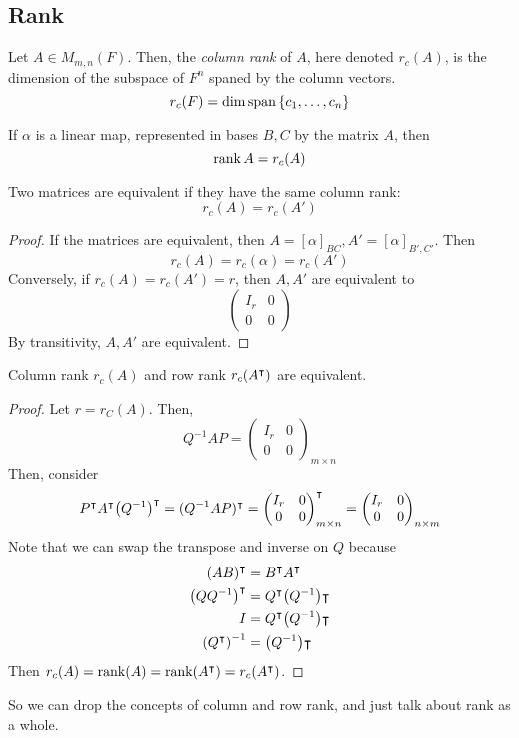 \subsection{Rank}
\begin{definition}
	Let \( A \in M_{m,n}(F) \).
	Then, the \textit{column rank} of \( A \), here denoted \( r_c(A) \), is the dimension of the subspace of \( F^n \) spaned by the column vectors.
	\[
		r_c(F) = \dim \operatorname{span} \qty{c_1, \dots, c_n}
	\]
\end{definition}
\begin{remark}
	If \( \alpha \) is a linear map, represented in bases \( B, C \) by the matrix \( A \), then
	\[
		\rank A = r_c(A)
	\]
\end{remark}
\begin{proposition}
	Two matrices are equivalent if they have the same column rank:
	\[
		r_c(A) = r_c(A')
	\]
\end{proposition}
\begin{proof}
	If the matrices are equivalent, then \( A = [\alpha]_{BC}, A' = [\alpha]_{B',C'} \).
	Then
	\[
		r_c(A) = r_c(\alpha) = r_c(A')
	\]
	Conversely, if \( r_c(A) = r_c(A') = r \), then \( A, A' \) are equivalent to
	\[
		\begin{pmatrix}
			I_r & 0 \\
			0   & 0
		\end{pmatrix}
	\]
	By transitivity, \( A, A' \) are equivalent.
\end{proof}
\begin{theorem}
	Column rank \( r_c(A) \) and row rank \( r_c(A^\intercal) \) are equivalent.
\end{theorem}
\begin{proof}
	Let \( r = r_C(A) \).
	Then,
	\[
		Q^{-1}AP = \begin{pmatrix}
			I_r & 0 \\
			0   & 0
		\end{pmatrix}_{m \times n}
	\]
	Then, consider
	\[
		P^\intercal A^\intercal \qty(Q^{-1})^\intercal = (Q^{-1}AP)^\intercal = \begin{pmatrix}
			I_r & 0 \\
			0   & 0
		\end{pmatrix}_{m \times n}^\intercal = \begin{pmatrix}
			I_r & 0 \\
			0   & 0
		\end{pmatrix}_{n \times m}
	\]
	Note that we can swap the transpose and inverse on \( Q \) because
	\begin{align*}
		(AB)^\intercal          & = B^\intercal A^\intercal           \\
		\qty(QQ^{-1})^\intercal & = Q^\intercal \qty(Q^{-1})\intercal \\
		I                        & = Q^\intercal \qty(Q^{-1})\intercal \\
		\qty(Q^\intercal)^{-1}  & = \qty(Q^{-1})\intercal
	\end{align*}
	Then \( r_c(A) = \rank(A) = \rank(A^\intercal) = r_c(A^\intercal) \).
\end{proof}
\noindent So we can drop the concepts of column and row rank, and just talk about rank as a whole.

